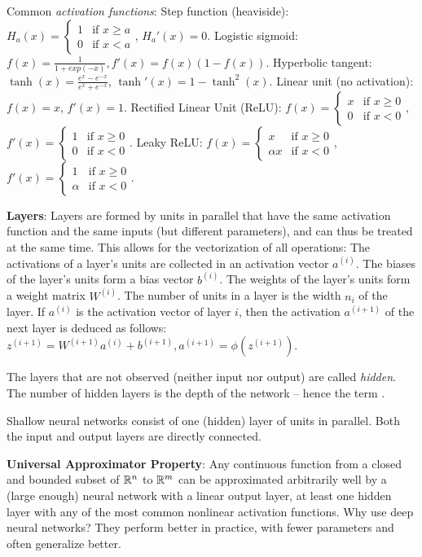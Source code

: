 Common \textit{activation functions}: 
Step function (heaviside): 
$H_a (x) = \begin{cases} 
1 & \mbox{if } x \geq a \\
0 & \mbox{if } x < a
\end{cases}$, $H_a' (x) = 0$.
Logistic sigmoid: $f(x) = \frac{1}{1+exp(-x)}, f'(x) = f(x)(1-f(x))$.
Hyperbolic tangent: $\tanh(x) = \frac{e^x - e^{-x}}{e^x + e^{-x}}$, $\tanh'(x)=1-\tanh^2(x)$.
Linear unit (no activation): $f(x)=x$, $f'(x)=1$.
Rectified Linear Unit (ReLU): $f(x) = \begin{cases} 
x & \mbox{if } x \geq 0 \\
0 & \mbox{if } x < 0
\end{cases}$, $f' (x) = \begin{cases} 
1 & \mbox{if } x \geq 0 \\
0 & \mbox{if } x < 0
\end{cases}$.
Leaky ReLU: $f(x) = \begin{cases} 
x & \mbox{if } x \geq 0 \\
\alpha x & \mbox{if } x < 0
\end{cases}$, $f' (x) = \begin{cases} 
1 & \mbox{if } x \geq 0 \\
\alpha & \mbox{if } x < 0
\end{cases}$.

\textbf{Layers}: Layers are formed by units in parallel that have the same activation function and
the same inputs (but different parameters), and can thus be treated at the same time.
This allows for the vectorization of all operations:
The activations of a layer’s units are collected in an activation vector $a^{(i)}$. 
The biases of the layer’s units form a bias vector $b^{(i)}$.
The weights of the layer’s units form a weight matrix $W^{(i)}$.
The number of units in a layer is the width $n_i$ of the layer.
If $a^{(i)}$ is the activation vector of layer $i$, then the activation $a^{(i+1)}$ of the next layer is deduced as follows:
$z^{(i+1)} = W^{(i+1)}a^{(i)} + b^{(i+1)}, a^{(i+1)}=\phi (z^{(i+1)})$.

The layers that are not observed (neither input nor output) are called \textit{hidden}.
The number of hidden layers is the depth of the network – hence the term .

Shallow neural networks consist of one (hidden) layer of units in parallel. 
Both the input and output layers are directly connected.

\textbf{Universal Approximator Property}: Any continuous function from a closed and bounded subset of $\mathbb{R}^n$ to $\mathbb{R}^m$ can be approximated arbitrarily well by a (large enough) neural network with a linear output layer, at least one hidden layer with any of the most common nonlinear activation
functions.
Why use deep neural networks? They perform better in practice, with fewer parameters and often generalize better.

